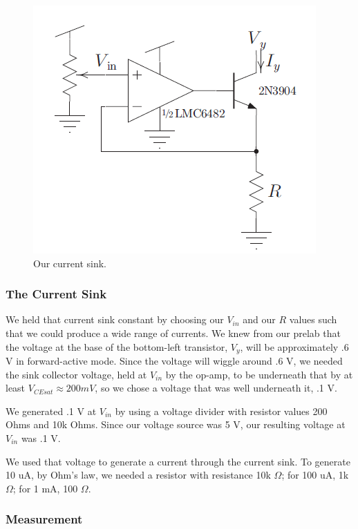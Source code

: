 \documentclass{article}
\begin{document}
\begin{figure}[H]
\begin{center}
\includegraphics[scale=.5]{sink.png}
\caption{Our current sink.}
\label{fig:sink}
\end{center}
\end{figure}

\subsubsection*{The Current Sink}

We held that current sink constant by choosing our $V_{in}$ and our $R$ values such that we could produce a wide range of currents.  We knew from our prelab that the voltage at the base of the bottom-left transistor, $V_y$, will be approximately .6 V in forward-active mode.  Since the voltage will wiggle around .6 V, we needed the sink collector voltage, held at $V_{in}$ by the op-amp, to be underneath that by at least $V_{CEsat} \approx 200 mV$, so we chose a voltage that was well underneath it,  .1 V.

We generated .1 V at $V_{in}$ by using a voltage divider with resistor values 200 Ohms and 10k Ohms. Since our voltage source was 5 V, our resulting voltage at $V_{in}$ was .1 V.  

We used that voltage to generate a current through the current sink.  To generate 10 uA, by Ohm's law, we needed a resistor with resistance 10k $\Omega$; for 100 uA, 1k $\Omega$; for 1 mA, 100 $\Omega$.

\subsubsection*{Measurement}
\end{document}
